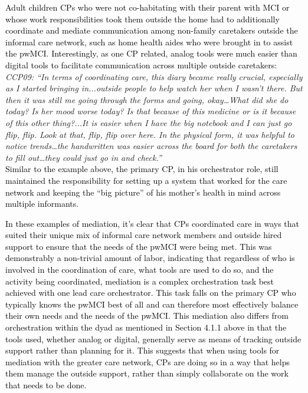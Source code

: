 \documentclass[acmsmall]{acmart}
\begin{document}
\textcolor{black}{Adult children CPs who were not co-habitating with their parent with MCI or whose work responsibilities took them outside the home had to additionally coordinate and mediate communication among non-family caretakers outside the informal care network, such as home health aides who were brought in to assist the pwMCI. Interestingly, as one CP related, analog tools were much easier than digital tools to facilitate communication across multiple outside caretakers:}\\

\textit{CCP09:  “In terms of coordinating care, this diary became really crucial, especially as I started bringing in...outside people to help watch her when I wasn't there. But then it was still me going through the forms and going, okay…What did she do today? Is her mood worse today? Is that because of this medicine or is it because of this other thing?...It is easier when I have the big notebook and I can just go flip, flip. Look at that, flip, flip over here. In the physical form, it was helpful to notice trends…the handwritten was easier across the board for both the caretakers to fill out…they could just go in and check.”}
\\

\textcolor{black}{Similar to the example above, the primary CP, in his orchestrator role, still maintained the responsibility for setting up a system that worked for the care network and \textcolor{black}{keeping} the “big picture” of his mother’s health in mind across multiple informants.}

\textcolor{black}{In these examples of mediation, it’s clear that CPs coordinated care in ways that suited their unique mix of informal care network members and  outside hired support to ensure that the needs of the pwMCI were being met. This was demonstrably a non-trivial amount of labor, indicating that regardless of who is involved in the coordination of care, what tools are used to do so, and the activity being coordinated, mediation is a complex orchestration task best achieved with one lead care orchestrator. This task falls on the primary CP who typically knows the pwMCI best of all and can therefore most effectively balance their own needs and the needs of the pwMCI. This mediation also differs from orchestration within the dyad as mentioned in Section 4.1.1 above in that the tools used, whether analog or digital, generally serve as means of tracking outside support rather than planning for it. This suggests that when using tools for mediation with the greater care network, CPs are doing so in a way that helps them manage the outside support, rather than simply collaborate on the work that needs to be done.}
\end{document}
